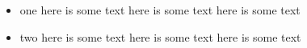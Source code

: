 \begin{itemize}
	\item one
	      here is some text
	      here is some text
	      here is some text
	\item two
	      here is some text
	      here is some text
	      here is some text
\end{itemize}

